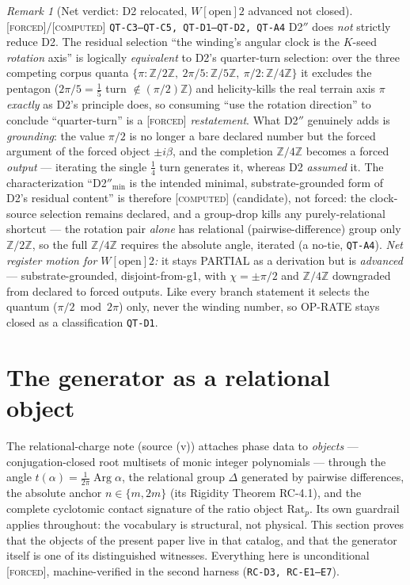\documentclass[11pt]{article}
\newcommand{\tagF}{\textcolor{cF}{\textsc{[forced]}}}
\newcommand{\tagC}{\textcolor{cC}{\textsc{[computed]}}}
\newcommand{\hx}[1]{\textcolor{cC}{\footnotesize\texttt{#1}}}
\newcommand{\Z}{\mathbb{Z}}
\DeclareMathOperator{\Arg}{Arg}
\theoremstyle{plain}
\theoremstyle{definition}
\theoremstyle{remark}
\newtheorem{remark}[theorem]{Remark}
\begin{document}
\begin{remark}[Net verdict: D2 relocated, {$W[\text{open}]2$} advanced not closed]\label{rem:d2verdict}\tagF{}/\tagC{} \hx{QT-C3--QT-C5, QT-D1--QT-D2, QT-A4}
D2$''$ does \emph{not} strictly reduce D2. The residual selection ``the winding's
angular clock is the $K$-seed \emph{rotation} axis'' is logically
\emph{equivalent} to D2's quarter-turn selection: over the three competing corpus
quanta $\{\pi:\Z/2\Z,\ 2\pi/5:\Z/5\Z,\ \pi/2:\Z/4\Z\}$ it excludes the pentagon
($2\pi/5=\tfrac15$ turn $\notin(\pi/2)\Z$) and helicity-kills the real terrain
axis $\pi$ \emph{exactly} as D2's principle does, so consuming ``use the rotation
direction'' to conclude ``quarter-turn'' is a \tagF{} \emph{restatement}. What
D2$''$ genuinely adds is \emph{grounding}: the value $\pi/2$ is no longer a bare
declared number but the forced argument of the forced object $\pm i\beta$, and
the completion $\Z/4\Z$ becomes a forced \emph{output} --- iterating the single
$\tfrac14$ turn generates it, whereas D2 \emph{assumed} it. The characterization
``D2$''_{\min}$ is the intended minimal, substrate-grounded form of D2's residual
content'' is therefore \tagC{} (candidate), not forced: the clock-source
selection remains declared, and a group-drop kills any purely-relational
shortcut --- the rotation pair \emph{alone} has relational (pairwise-difference)
group only $\Z/2\Z$, so the full $\Z/4\Z$ requires the absolute angle, iterated
(a no-tie, \hx{QT-A4}). \emph{Net register motion for $W[\text{open}]2$:} it
stays PARTIAL as a derivation but is \emph{advanced} --- substrate-grounded,
disjoint-from-g1, with $\chi=\pm\pi/2$ and $\Z/4\Z$ downgraded from declared to
forced outputs. Like every branch statement it selects the quantum
($\pi/2\bmod2\pi$) only, never the winding number, so OP-RATE stays closed as a
classification \hx{QT-D1}.
\end{remark}


\section{The generator as a relational object}\label{sec:relobject}

The relational-charge note (source (v)) attaches phase data to \emph{objects}
--- conjugation-closed root multisets of monic integer polynomials --- through
the angle $t(\alpha)=\tfrac1{2\pi}\Arg\alpha$, the relational group
$\Delta$ generated by pairwise differences, the absolute anchor
$n\in\{m,2m\}$ (its Rigidity Theorem RC-4.1), and the complete cyclotomic
contact signature of the ratio object $\mathrm{Rat}_p$. Its own guardrail
applies throughout: the vocabulary is structural, not physical. This section
proves that the objects of the present paper live in that catalog, and that
the generator itself is one of its distinguished witnesses. Everything here is
unconditional \tagF{}, machine-verified in the second harness
(\hx{RC-D3, RC-E1--E7}).
\end{document}
